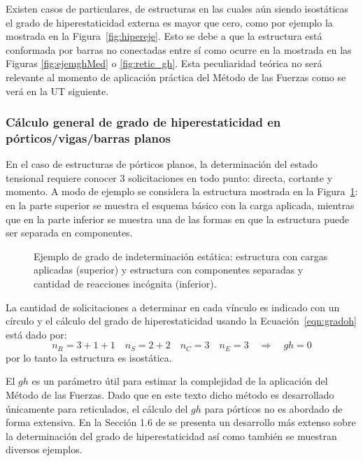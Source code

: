 Existen casos de particulares, de estructuras en las cuales aún siendo isostáticas el grado de hiperestaticidad externa es mayor que cero, como por ejemplo la mostrada en la Figura~\ref{fig:hipereje}. %
%
Esto se debe a que la estructura está conformada por barras no conectadas entre sí como ocurre en la mostrada en las Figuras \ref{fig:ejemghMed} o \ref{fig:retic_gh}. %
%
Esta peculiaridad teórica no será relevante al momento de aplicación práctica del Método de las Fuerzas como se verá en la UT siguiente.


\subsubsection{Cálculo general de grado de hiperestaticidad en pórticos/vigas/barras planos}

En el caso de estructuras de pórticos planos, la determinación del estado tensional requiere conocer 3 solicitaciones en todo punto: directa, cortante y momento. %
%
A modo de ejemplo se considera la estructura mostrada en la Figura~\ref{fig:gerb}: en la parte superior se muestra el esquema básico con la carga aplicada, mientras que en la parte inferior se muestra una de las formas en que la estructura puede ser separada en componentes. 
%
\begin{figure}[htb]
	\centering
	\def\svgwidth{0.7\textwidth}
	
	\caption{Ejemplo de grado de indeterminación estática: estructura con cargas aplicadas (superior) y estructura con componentes separadas y cantidad de reacciones incógnita (inferior).}
	\label{fig:gerb}
\end{figure}

La cantidad de solicitaciones a determinar en cada vínculo es indicado con un círculo y el cálculo del grado de hiperestaticidad usando la Ecuación~\eqref{eqn:gradoh} está dado por:
%
\begin{equation}
n_R = 3+1+1 \quad n_S = 2+2 \quad n_C = 3 \quad n_E = 3 \quad \Rightarrow \quad gh = 0
\end{equation}
%
por lo tanto la estructura es isostática.

El $gh$ es un parámetro útil para estimar la complejidad de la aplicación del Método de las Fuerzas. %
%
Dado que en este texto dicho método es desarrollado únicamente para reticulados, el cálculo del $gh$ para pórticos no es abordado de forma extensiva. %
%
En la Sección 1.6 de \citep{CerveraRuiz2002ii} se presenta un desarrollo más extenso sobre la determinación del grado de hiperestaticidad así como también se muestran diversos ejemplos.


